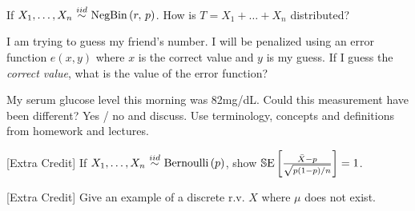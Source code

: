 \documentclass[12pt]{article}
\begin{document}
 If $X_1, \ldots, X_n \iid \negbin{r}{p}$. How is $T = X_1 + \ldots + X_n$ distributed? 

 I am trying to guess my friend's number. I will be penalized using an error function $e(x,y)$ where $x$ is the correct value and $y$ is my guess. If I guess the \textit{correct value}, what is the value of the error function? 

 My serum glucose level this morning was 82mg/dL. Could this measurement have been different? Yes / no and discuss. Use terminology, concepts and definitions from homework and lectures. 

 [Extra Credit] If $X_1, \ldots, X_n \iid \bernoulli{p}$, show $\mathbb{S}\text{E}\left[\frac{\bar{X} - p}{\sqrt{p(1-p)/n}}\right] = 1$. 

 [Extra Credit] Give an example of a discrete r.v. $X$ where $\mu$ does not exist.


\eenum
\end{document}
